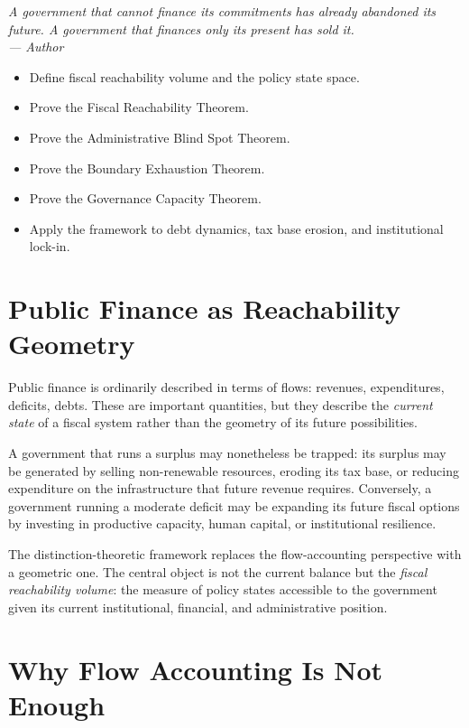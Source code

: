 \documentclass[12pt,twoside,openright]{book}
\newenvironment{epigraph}[2]{%
  \vspace{1em}\begin{flushright}
  \begin{minipage}{0.72\textwidth}
  \itshape\small #1\\[0.4em]
  \upshape\footnotesize\sffamily\color{DistGray}--- #2
  \end{minipage}\end{flushright}\vspace{1.5em}}{}
\newenvironment{objectives}{%
  \begin{tcolorbox}[colback=DistBlue!5,colframe=DistBlue,
    title={\faCheckCircle\enspace Learning Objectives},
    fonttitle=\sffamily\bfseries\color{white},
    attach boxed title to top left={yshift=-2mm,xshift=4mm},
    boxed title style={colback=DistBlue},breakable]
  \begin{itemize}[leftmargin=*,nosep]}{%
  \end{itemize}\end{tcolorbox}\vspace{1em}}
\begin{document}
\begin{epigraph}{%
  A government that cannot finance its commitments
  has already abandoned its future.
  A government that finances only its present
  has sold it.}%
  {Author}
\end{epigraph}

\begin{objectives}
  \item Define fiscal reachability volume and the policy
        state space.
  \item Prove the Fiscal Reachability Theorem.
  \item Prove the Administrative Blind Spot Theorem.
  \item Prove the Boundary Exhaustion Theorem.
  \item Prove the Governance Capacity Theorem.
  \item Apply the framework to debt dynamics, tax base
        erosion, and institutional lock-in.
\end{objectives}

\section{Public Finance as Reachability Geometry}

Public finance is ordinarily described in terms of
flows: revenues, expenditures, deficits, debts.
These are important quantities, but they describe the
\emph{current state} of a fiscal system rather than the
geometry of its future possibilities.

A government that runs a surplus may nonetheless be
trapped: its surplus may be generated by selling
non-renewable resources, eroding its tax base, or
reducing expenditure on the infrastructure that future
revenue requires. Conversely, a government running a
moderate deficit may be expanding its future fiscal
options by investing in productive capacity, human
capital, or institutional resilience.

The distinction-theoretic framework replaces the
flow-accounting perspective with a geometric one. The
central object is not the current balance but the
\emph{fiscal reachability volume}: the measure of policy
states accessible to the government given its current
institutional, financial, and administrative position.

\section{Why Flow Accounting Is Not Enough}
\label{sec:ch27-why-flow}
\end{document}
